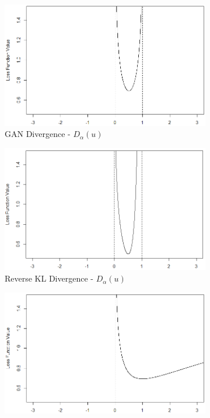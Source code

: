 \documentclass[honours,12pt]{unswthesis}
\numberwithin{equation}{section}
\theoremstyle{definition}
\begin{document}
\begin{figure}[h!]
\begin{subfigure}{0.49\textwidth}
\includegraphics[width=\linewidth]{ADVD.png}
\caption{GAN Divergence - $D_\alpha(u)$}
\end{subfigure}
\begin{subfigure}{0.49\textwidth}
\includegraphics[width=\linewidth]{KLD.png}
\caption{Reverse KL Divergence - $D_\alpha(u)$}
\end{subfigure}
\begin{subfigure}{0.49\textwidth}
\includegraphics[width=\linewidth]{ADVR.png}

\end{subfigure}
\end{figure}
\end{document}
